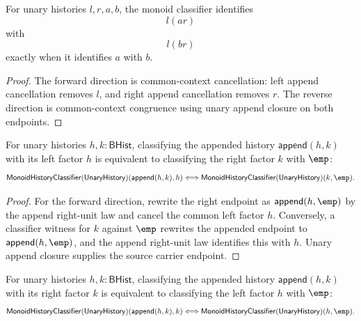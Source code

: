 \begin{theorem}
\label{thm:unary-append-monoid-classifier-context-iff}
For unary histories $l,r,a,b$, the monoid classifier identifies
$$
l(a r)
$$
with
$$
l(b r)
$$
exactly when it identifies $a$ with $b$.
\end{theorem}
\begin{proof}
The forward direction is common-context cancellation: left append cancellation
removes $l$, and right append cancellation removes $r$. The reverse direction
is common-context congruence using unary append closure on both endpoints.
\end{proof}

\begin{theorem}
\label{thm:unary-append-monoid-left-factor-empty-iff}
For unary histories $h,k:\mathsf{BHist}$, classifying the appended history
$\mathsf{append}(h,k)$ with its left factor $h$ is equivalent to classifying
the right factor $k$ with $\emp$:
$$
\mathsf{MonoidHistoryClassifier}(\mathsf{UnaryHistory})(\mathsf{append}(h,k),h)
\Longleftrightarrow
\mathsf{MonoidHistoryClassifier}(\mathsf{UnaryHistory})(k,\emp).
$$
\end{theorem}
\begin{proof}
For the forward direction, rewrite the right endpoint as
$\mathsf{append}(h,\emp)$ by the append right-unit law and cancel the common
left factor $h$. Conversely, a classifier witness for $k$ against $\emp$
rewrites the appended endpoint to $\mathsf{append}(h,\emp)$, and the append
right-unit law identifies this with $h$. Unary append closure supplies the
source carrier endpoint.
\end{proof}

\begin{theorem}
\label{thm:unary-append-monoid-right-factor-empty-iff}
For unary histories $h,k:\mathsf{BHist}$, classifying the appended history
$\mathsf{append}(h,k)$ with its right factor $k$ is equivalent to classifying
the left factor $h$ with $\emp$:
$$
\mathsf{MonoidHistoryClassifier}(\mathsf{UnaryHistory})(\mathsf{append}(h,k),k)
\Longleftrightarrow
\mathsf{MonoidHistoryClassifier}(\mathsf{UnaryHistory})(h,\emp).
$$
\end{theorem}

